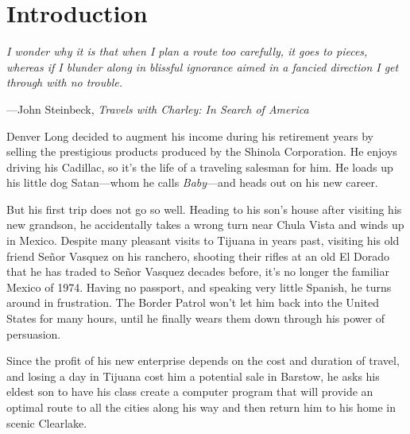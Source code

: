 \section{Introduction}

\textwidth
\epigraph{\emph{I wonder why it is that when I plan a route too
    carefully, it goes to pieces, whereas if I blunder along in blissful
    ignorance aimed in a fancied direction I get through with no
    trouble.}}{---John Steinbeck, \emph{Travels with Charley: In Search
    of America}}

\noindent
Denver Long decided to augment his income during his retirement
years by selling the prestigious products produced by the Shinola
Corporation.  He enjoys driving his Cadillac, so it's the life of
a traveling salesman for him.  He loads up his little dog Satan---whom
he calls \emph{Baby}---and heads out on his new career.

But his first trip does not go so well. Heading to his son's house
after visiting his new grandson, he accidentally takes a wrong turn
near Chula Vista and winds up in Mexico.  Despite many pleasant
visits to Tijuana in years past, visiting his old friend Se\~nor Vasquez
on his ranchero, shooting their rifles at an old El Dorado that he has traded to Se\~nor
Vasquez decades before,
it's no longer the familiar Mexico of 1974.  Having
no passport, and speaking very little Spanish, he turns around in
frustration.  The Border Patrol won't let him back into the United
States for many hours, until he finally wears them down through his
power of persuasion.

Since the profit of his new enterprise depends
on the cost and duration of travel, and losing a day in Tijuana
cost him a potential sale in Barstow, he asks his eldest son to
have his class create a computer program that will provide an optimal
route to all the cities along his way and then return him to his
home in scenic Clearlake.
